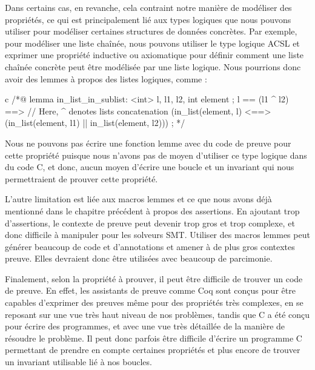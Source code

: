 Dans certains cas, en revanche, cela contraint notre manière de modéliser des
propriétés, ce qui est principalement lié aux types logiques que nous pouvons
utiliser pour modéliser certaines structures de données concrètes. Par exemple,
pour modéliser une liste chaînée, nous pouvons utiliser le type logique ACSL
 et exprimer une propriété inductive ou
axiomatique pour définir comment une liste chaînée concrète peut être modélisée
par une liste logique. Nous pourrions donc avoir des lemmes à propos des listes
logiques, comme :

\begin{CodeBlock}{c}
/*@
  lemma in_list_in_sublist:
    \forall \list<int> l, l1, l2, int element ;
      l == (l1 ^ l2) ==>      // Here, ^ denotes lists concatenation
      (in_list(element, l) <==> (in_list(element, l1) || in_list(element, l2))) ;
*/
\end{CodeBlock}


Nous ne pouvons pas écrire une fonction lemme avec du code de preuve
pour cette propriété puisque nous n'avons pas de moyen d'utiliser ce type logique
dans du code C, et donc, aucun moyen d'écrire une boucle et un invariant qui nous
permettraient de prouver cette propriété.


L'autre limitation est liée aux macros lemmes et ce que nous avons déjà
mentionné dans le chapitre précédent à propos des assertions. En ajoutant trop
d'assertions, le contexte de preuve peut devenir trop gros et trop complexe, et
donc difficile à manipuler pour les solveurs SMT. Utiliser des
macros lemmes peut générer beaucoup de code et d'annotations et amener
à de plus gros contextes preuve. Elles devraient
donc être utilisées avec beaucoup de parcimonie.


Finalement, selon la propriété à prouver, il peut être difficile de trouver un
code de preuve. En effet, les assistants de preuve comme Coq sont conçus pour
être capables d'exprimer des preuves même pour des propriétés très complexes,
en se reposant sur une vue très haut niveau de nos problèmes, tandis que C a été
conçu pour écrire des programmes, et avec une vue très détaillée de la manière de
résoudre le problème. Il peut donc parfois être difficile d'écrire un programme
C permettant de prendre en compte certaines propriétés et plus encore de trouver
un invariant utilisable lié à nos boucles.




